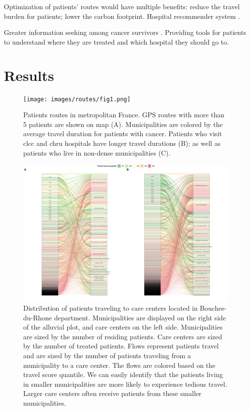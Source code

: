 Optimization of patients' routes would have multiple benefits: reduce the travel burden for patients; lower the carbon footprint.
Hospital recommender system \cite{zhang_idoctor_2017,han_hybrid_2018,narducci_recommender_2015,hoens_reliable_2010,tran_recommender_2021}.

Greater information seeking among cancer survivors \cite{finney_rutten_cancer-related_2016}. Providing tools for patients to understand where they are treated and which hospital they should go to.

\section{Results}

\begin{figure}[h]
    \texttt{[image: images/routes/fig1.png]}
    \centering
    \caption{
        Patients routes in metropolitan France. GPS routes with more than 5 patients are shown on map (A). Municipalities are colored by the average travel duration for patients with cancer. Patients who visit \ac{clcc} and \ac{chru} hospitals have longer travel durations (B); as well as patients who live in non-dense municipalities (C).
    }
    \label{fig:routes-duration-france}
\end{figure}

\begin{figure}[h]
    \includegraphics[width=\textwidth]{images/routes/fig6.png}
    \centering
    \caption{
        Distribution of patients traveling to care centers located in Bouches-du-Rhone department. Municipalities are displayed on the right side of the alluvial plot, and care centers on the left side. Municipalities are sized by the number of residing patients. Care centers are sized by the number of treated patients. Flows represent patients travel and are sized by the number of patients traveling from a municipality to a care center. The flows are colored based on the travel score quantile. We can easily identify that the patients living in smaller municipalities are more likely to experience tedious travel. Larger care centers often receive patients from these smaller municipalities.
    }
    \label{fig:routes-alluvial-13}
\end{figure}

